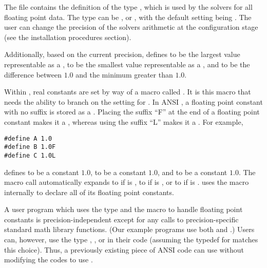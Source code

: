%
The  file contains the definition of the type ,
which is used by the {\sundials} solvers for all floating point data.
The type  can be ,  or , with
the default setting being .
The user can change the precision of the {\sundials} solvers arithmetic at the
configuration stage (see the {\sundials} installation procedures section).

Additionally, based on the current precision,  defines 
 to be the largest value representable as a ,
 to be the smallest value representable as a , and
 to be the difference between $1.0$ and the minimum 
greater than $1.0$.

Within {\sundials}, real constants are set by way of a macro called
.  It is this macro that needs the ability to branch on the
setting for .  In ANSI {\C}, a floating point constant with no
suffix is stored as a .  Placing the suffix ``F'' at the
end of a floating point constant makes it a , whereas using the suffix
``L'' makes it a .  For example,
\begin{verbatim}
#define A 1.0
#define B 1.0F
#define C 1.0L
\end{verbatim}
defines  to be a  constant $1.0$,  to be a
 constant $1.0$, and  to be a  constant
$1.0$.  The macro call  automatically expands to 
if  is , to  if  is ,
or to  if  is .  {\sundials} uses the
 macro internally to declare all of its floating point constants. 

A user program which uses the type  and the  macro
to handle floating point constants is precision-independent except for
any calls to precision-specific standard math library
functions.  (Our example programs use both  and
.)  Users can, however, use the type , , or
 in their code (assuming the typedef for  matches
this choice).  Thus, a previously existing piece of ANSI {\C} code can use
{\sundials} without modifying the codes to use .
